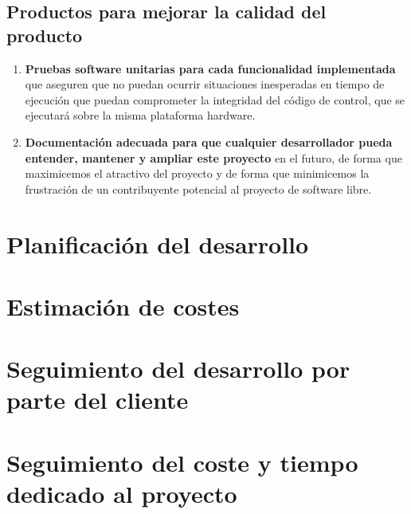 \subsection{Productos para mejorar la calidad del producto}

\begin{enumerate}
    \item \textbf{Pruebas software unitarias para cada funcionalidad implementada} que aseguren que no
    puedan ocurrir situaciones inesperadas en tiempo
    de ejecución que puedan comprometer la integridad del código de control, que se ejecutará sobre
    la misma plataforma hardware.
    \item \textbf{Documentación adecuada para que cualquier desarrollador pueda entender,
    mantener y ampliar este proyecto} en el futuro, de forma que maximicemos el atractivo
    del proyecto y de forma que minimicemos la frustración de un contribuyente potencial
    al proyecto de software libre.
\end{enumerate}

\section{Planificación del desarrollo}


\section{Estimación de costes}


\section{Seguimiento del desarrollo por parte del cliente}


\section{Seguimiento del coste y tiempo dedicado al proyecto}


